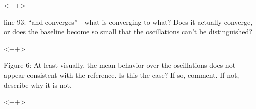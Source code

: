 \documentclass[answers,11pt]{exam}
\begin{document}
\begin{questions}
        \begin{solution}
        <++>
        \end{solution}


        \question line 93: ``and converges'' - what is converging to what?  
        Does it actually converge, or does the baseline become so small that 
        the oscillations can't be distinguished?

        \begin{solution}
        <++>
        \end{solution}


        \question Figure 6: At least visually, the mean behavior over the 
        oscillations does not appear consistent with the reference.  Is this 
        the case? If so, comment.  If not, describe why it is not.

        \begin{solution}
        <++>
        \end{solution}


\end{questions}


\end{document}
